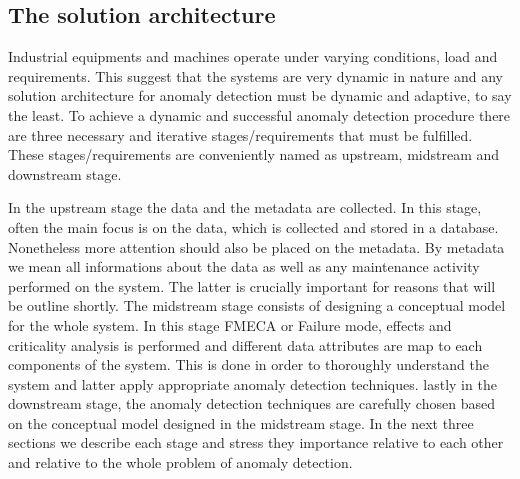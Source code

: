 \documentclass[11pt, oneside]{article}   	%
\begin{document}
\subsection{The solution architecture}
Industrial equipments and machines operate under varying conditions, load and requirements. This suggest that the systems are very dynamic in nature and any solution architecture for anomaly detection must be dynamic and adaptive, to say the least. To achieve a dynamic and successful anomaly detection procedure there are three necessary and iterative stages/requirements that must be fulfilled. 
These stages/requirements are conveniently named as upstream, midstream and downstream stage.
\justify
\begin{center}
   \end{center}
   
\justify
In the upstream stage the data and the metadata are collected. In this stage, often the main focus is on the data, which is collected and stored in a database. Nonetheless more attention should also be placed on the metadata. By metadata we mean all informations about the data as well as any maintenance activity performed on the system. The latter is crucially important for reasons that will be outline shortly. 
\justify
The midstream stage consists of designing a conceptual model for the whole system.
In this stage FMECA or Failure mode, effects and criticality analysis is performed and different data attributes are map to each components of the system. This is done in order to thoroughly understand the system and latter apply appropriate anomaly detection techniques.
\justify
lastly in the downstream stage, the anomaly detection techniques are carefully chosen based on the conceptual model designed in the midstream stage. In the next three sections we describe each stage and stress they importance relative to each other and relative to the whole problem of anomaly detection.
\end{document}
